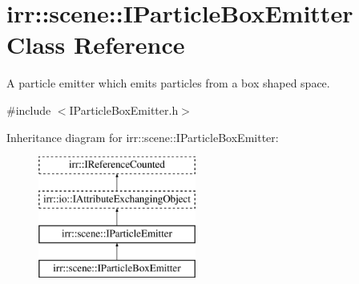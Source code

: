 \hypertarget{classirr_1_1scene_1_1IParticleBoxEmitter}{}\section{irr\+:\+:scene\+:\+:I\+Particle\+Box\+Emitter Class Reference}
\label{classirr_1_1scene_1_1IParticleBoxEmitter}


A particle emitter which emits particles from a box shaped space.  




{\ttfamily \#include $<$I\+Particle\+Box\+Emitter.\+h$>$}

Inheritance diagram for irr\+:\+:scene\+:\+:I\+Particle\+Box\+Emitter\+:\begin{figure}[H]
\begin{center}
\leavevmode
\includegraphics[height=4.000000cm]{classirr_1_1scene_1_1IParticleBoxEmitter}
\end{center}
\end{figure}
